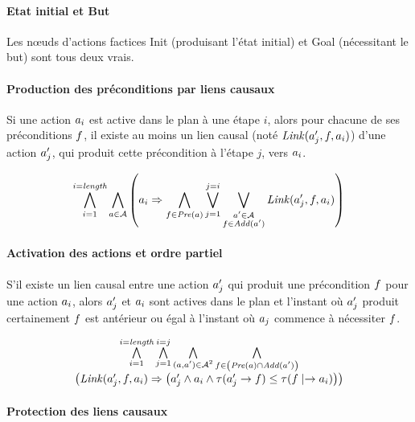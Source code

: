 %
%


\paragraph{Etat initial et But}

Les nœuds d'actions factices Init (produisant l'état initial) et Goal (nécessitant le but) sont tous deux vrais.

\paragraph{Production des préconditions par liens causaux}

Si une action $a_{i}$ est active dans le plan à une étape $i$, alors pour chacune de ses préconditions $f$, il existe au moins un lien causal (noté $\mathit{Link}(a'_{j},f,a_{i})$) d'une action $a'_{j}$, qui produit cette précondition à l'étape $j$, vers $a_{i}$.

\[ \bigwedge\limits_{\substack{i=1}}^{i=\textit{length}} \bigwedge\limits_{\substack{a\in\mathcal{A}}} \left( a_{i} \Rightarrow \bigwedge\limits_{\substack{f\in\mathit{Pre}(a)}} \bigvee\limits_{\substack{j=1}}^{j=i}\bigvee\limits_{\substack{a'\in\mathcal{A}\\f\in\mathit{Add}(a')}} \mathit{Link}(a'_{j},f,a_{i}) \right)
\]

\paragraph{Activation des actions et ordre partiel}

S’il existe un lien causal entre une action $a'_{j}$ qui produit une précondition $f$ pour une action $a_{i}$, alors $a'_{j}$ et $a_{i}$ sont actives dans le plan et l’instant où $a'_{j}$ produit certainement $f$ est antérieur ou égal à l’instant où $a_{j}$ commence à nécessiter $f$.

\[
\begin{matrix}
\bigwedge\limits_{\substack{i=1}}^{i=\textit{length}} \bigwedge\limits_{\substack{j=1}}^{i=j} \bigwedge\limits_{\substack{(a,a')\in\mathcal{A}^{2}}} \bigwedge\limits_{\substack{f\in\left(\mathit{Pre}(a)\cap\mathit{Add}(a')\right)}}\\ \left( \mathit{Link}(a'_{j},f,a_{i}) \Rightarrow \left( a'_{j} \wedge a_{i} \wedge \tau(a'_{j}\rightarrow f) \leq \tau(f\mid\rightarrow a_{i}) \right) \right)
\end{matrix}
\]

\paragraph{Protection des liens causaux}

